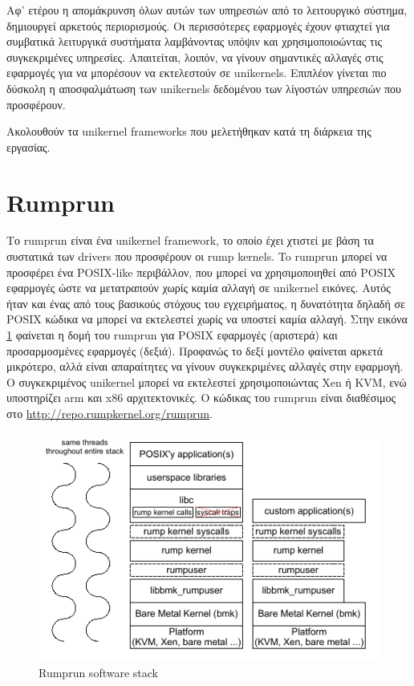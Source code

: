 Αφ' ετέρου η απομάκρυνση όλων αυτών των υπηρεσιών από το λειτουργικό σύστημα,
δημιουργεί αρκετούς περιορισμούς. Οι περισσότερες εφαρμογές έχουν φτιαχτεί για
συμβατικά λειτυργικά συστήματα λαμβάνοντας υπόψιν και χρησιμοποιοώντας τις
συγκεκριμένες υπηρεσίες. Απαιτείται, λοιπόν, να γίνουν σημαντικές αλλαγές στις
εφαρμογές για να μπορέσουν να εκτελεστούν σε unikernels. Επιπλέον γίνεται πιο
δύσκολη η αποσφαλμάτωση των unikernels δεδομένου των λίγοστών υπηρεσιών που
προσφέρουν. 

Ακολουθούν τα unikernel frameworks που μελετήθηκαν κατά τη διάρκεια της εργασίας.

\section{Rumprun}
Το rumprun είναι ένα unikernel framework, το οποίο έχει χτιστεί με βάση τα
συστατικά των drivers που προσφέρουν οι rump kernels. 
To rumprun μπορεί να προσφέρει ένα POSIX-like περιβάλλον, που μπορεί να
χρησιμοποιηθεί από POSIX εφαρμογές ώστε να μετατραπούν χωρίς καμία αλλαγή σε
unikernel εικόνες. Αυτός ήταν και ένας από τους βασικούς στόχους του
εγχειρήματος, η δυνατότητα δηλαδή σε POSIX κώδικα να μπορεί να εκτελεστεί χωρίς
να υποστεί καμία αλλαγή. Στην εικόνα \ref{fig3_2} φαίνεται η δομή του rumprun
για POSIX εφαρμογές (αριστερά) και προσαρμοσμένες εφαρμογές (δεξιά). Προφανώς το
δεξί μοντέλο φαίνεται αρκετά μικρότερο, αλλά είναι απαραίτητες να γίνουν
συγκεκριμένες αλλαγές στην εφαρμογή. O συγκεκριμένος unikernel μπορεί να
εκτελεστεί χρησιμοποιώντας Xen ή KVM, ενώ υποστηρίζει arm και x86
αρχιτεκτονικές. Ο κώδικας του rumprun είναι διαθέσιμος στο
\url{http://repo.rumpkernel.org/rumprun}. 

\begin{figure}[htp]
\centering
\includegraphics[scale=0.75]{figures/rumprun_stack.png}
\caption{Rumprun software stack\label{fig3_2}}
\end{figure}


